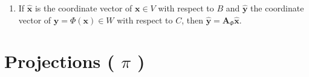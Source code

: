\begin{enumerate}
\begin{enumerate}
        \item If $\hat{\bm{x}}$ is the coordinate vector of $\bm{x} \in V$ with respect to $B$ and $\hat{\bm{y}}$ the coordinate vector of $\bm{y} = \Phi(\bm{x}) \in W$ with respect to $C$, then $\hat{\bm{y}} = \bm{A}_\Phi \hat{\bm{x}}$.
        \hfill \cite{mfml/book/mml/Deisenroth-Faisal-Ong}
    \end{enumerate}
\end{enumerate}












\section{Projections ( $\pi$ )}

